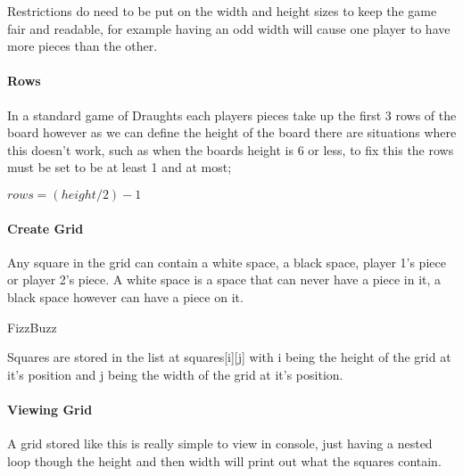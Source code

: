 \documentclass[10pt, a4paper]{article}
\begin{document}
   	Restrictions do need to be put on the width and height sizes to keep the game fair and readable, for example having an odd width will cause one player to have more pieces than the other.
   	
   	\paragraph{Rows}
   	In a standard game of Draughts each players pieces take up the first 3 rows of the board however as we can define the height of the board there are situations where this doesn't work, such as when the boards height is 6 or less, to fix this the rows must be set to be at least 1 and at most;
   	
   	    {\centering \Large \(
   	    rows
   		= (height/2) - 1
   		\)\par}
   	
   	\paragraph{Create Grid}
   	Any square in the grid can contain a white space, a black space, player 1's piece or player 2's piece. A white space is a space that can never have a piece in it, a black space however can have a piece on it.
   	
   	\begin{algorithm}[h]
   		\caption{FizzBuzz}
   	\end{algorithm}
   	
   	Squares are stored in the list at squares[i][j] with i being the height of the grid at it's position and j being the width of the grid at it's position.
   	
   	\paragraph{Viewing Grid}
   	A grid stored like this is really simple to view in console, just having a nested loop though the height and then width will print out what the squares contain. 
   	
\end{document}
